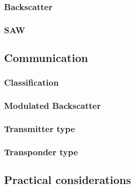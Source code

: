 \subsubsection{Backscatter}
\subsubsection{SAW}

\subsection{Communication}

\subsubsection{Classification}

\subsubsection{Modulated Backscatter}
\subsubsection{Transmitter type}
\subsubsection{Transponder type}

\subsection{Practical considerations}





